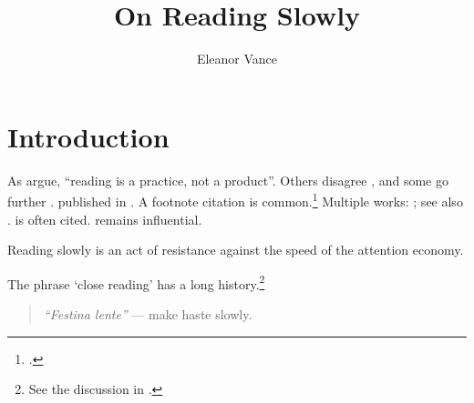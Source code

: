 \documentclass[12pt]{article}
\title{On Reading Slowly}
\author{Eleanor Vance}
\date{}
\begin{document}
\maketitle

\section*{Introduction}
As \textcite{smith2020} argue, \enquote{reading is a practice, not a product}.
Others disagree \parencite[p.~12]{knuth1984}, and some go further \autocite{lee2019}.
\citeauthor{smith2020} published in \citeyear{smith2020}. A footnote citation is common.\footcite{lee2019}
Multiple works: \parencite{smith2020,knuth1984}; see also \cite[see][ch. 2]{knuth1984}.
\Textcite{lee2019} is often cited.  remains influential.

\begin{displayquote}
Reading slowly is an act of resistance against the speed of the attention economy.
\end{displayquote}

The phrase \enquote*{close reading} has a long history.\footnote{See the discussion in \cite{smith2020}.}

\begin{quote}
\textit{``Festina lente''} --- make haste slowly.
\end{quote}

\nocite{web2023}
\printbibliography[title={Works Cited}, heading=bibintoc]
\end{document}
